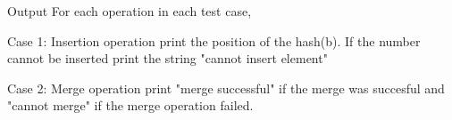 Output  
For each operation in each test case,  

   Case 1: Insertion operation print the position of the hash(b). If the number cannot be inserted print the string "cannot insert element"  

   Case 2: Merge operation print "merge successful" if the merge was succesful and "cannot merge" if the merge operation failed.